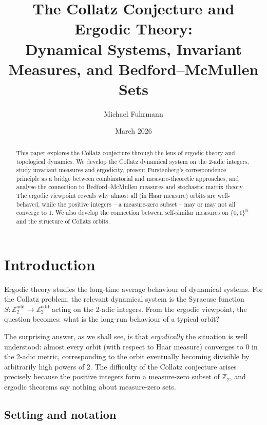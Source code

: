 \documentclass[12pt,a4paper]{article}
\begin{document}
\title{The Collatz Conjecture and Ergodic Theory:\\
Dynamical Systems, Invariant Measures, and Bedford--McMullen Sets}
\author{Michael Fuhrmann}
\date{March 2026}
\maketitle

\begin{abstract}
This paper explores the Collatz conjecture through the lens of ergodic theory and
topological dynamics. We develop the Collatz dynamical system on the 2-adic integers,
study invariant measures and ergodicity, present Furstenberg's correspondence principle
as a bridge between combinatorial and measure-theoretic approaches, and analyse the
connection to Bedford--McMullen measures and stochastic matrix theory. The ergodic
viewpoint reveals why almost all (in Haar measure) orbits are well-behaved, while
the positive integers -- a measure-zero subset -- may or may not all converge to 1.
We also develop the connection between self-similar measures on $\{0,1\}^\mathbb{N}$
and the structure of Collatz orbits.
\end{abstract}

\tableofcontents

\newpage

\section{Introduction}

Ergodic theory studies the long-time average behaviour of dynamical systems. For the
Collatz problem, the relevant dynamical system is the Syracuse function
$S\colon \mathbb{Z}_2^{\text{odd}} \to \mathbb{Z}_2^{\text{odd}}$ acting on the 2-adic
integers. From the ergodic viewpoint, the question becomes: what is the long-run
behaviour of a typical orbit?

The surprising answer, as we shall see, is that \emph{ergodically} the situation is
well understood: almost every orbit (with respect to Haar measure) converges to 0 in
the 2-adic metric, corresponding to the orbit eventually becoming divisible by arbitrarily
high powers of 2. The difficulty of the Collatz conjecture arises precisely because
the positive integers form a measure-zero subset of $\mathbb{Z}_2$, and ergodic theorems
say nothing about measure-zero sets.

\subsection{Setting and notation}
\end{document}
